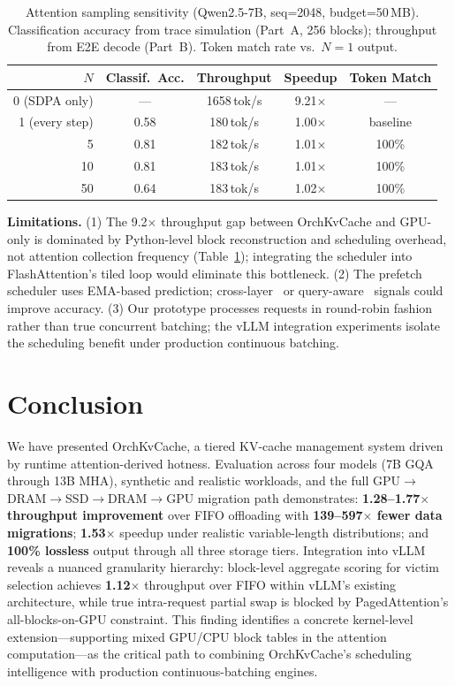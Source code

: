 \documentclass[conference]{IEEEtran}
\begin{document}
\begin{table}[t]
\centering
\caption{Attention sampling sensitivity (Qwen2.5-7B, seq=2048, budget=50\,MB). Classification accuracy from trace simulation (Part~A, 256 blocks); throughput from E2E decode (Part~B). Token match rate vs.\ $N{=}1$ output.}
\label{tab:sampling}
\small
\begin{tabular}{@{}rcccc@{}}
\toprule
$N$ & Classif.\ Acc. & Throughput & Speedup & Token Match \\
\midrule
0 (SDPA only) & --- & 1658\,tok/s & 9.21$\times$ & --- \\
1 (every step) & 0.58 & 180\,tok/s & 1.00$\times$ & baseline \\
5 & 0.81 & 182\,tok/s & 1.01$\times$ & 100\% \\
10 & 0.81 & 183\,tok/s & 1.01$\times$ & 100\% \\
50 & 0.64 & 183\,tok/s & 1.02$\times$ & 100\% \\
\bottomrule
\end{tabular}
\end{table}

\textbf{Limitations.} (1) The 9.2$\times$ throughput gap between OrchKvCache and GPU-only is dominated by Python-level block reconstruction and scheduling overhead, not attention collection frequency (Table~\ref{tab:sampling}); integrating the scheduler into FlashAttention's tiled loop would eliminate this bottleneck. (2) The prefetch scheduler uses EMA-based prediction; cross-layer~\cite{infinigen} or query-aware~\cite{quest} signals could improve accuracy. (3) Our prototype processes requests in round-robin fashion rather than true concurrent batching; the vLLM integration experiments isolate the scheduling benefit under production continuous batching.

\section{Conclusion}

We have presented OrchKvCache, a tiered KV-cache management system driven by runtime attention-derived hotness. Evaluation across four models (7B GQA through 13B MHA), synthetic and realistic workloads, and the full GPU$\to$DRAM$\to$SSD$\to$DRAM$\to$GPU migration path demonstrates: \textbf{1.28--1.77$\times$ throughput improvement} over FIFO offloading with \textbf{139--597$\times$ fewer data migrations}; \textbf{1.53$\times$} speedup under realistic variable-length distributions; and \textbf{100\% lossless} output through all three storage tiers. Integration into vLLM reveals a nuanced granularity hierarchy: block-level aggregate scoring for victim selection achieves \textbf{1.12$\times$} throughput over FIFO within vLLM's existing architecture, while true intra-request partial swap is blocked by PagedAttention's all-blocks-on-GPU constraint. This finding identifies a concrete kernel-level extension---supporting mixed GPU/CPU block tables in the attention computation---as the critical path to combining OrchKvCache's scheduling intelligence with production continuous-batching engines.
\end{document}
